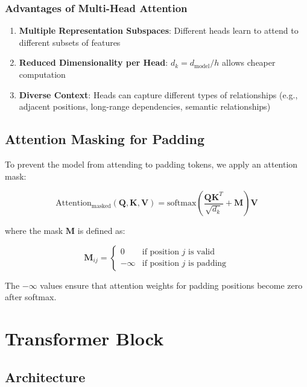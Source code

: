 \documentclass[11pt,a4paper]{article}
\begin{document}
\subsubsection{Advantages of Multi-Head Attention}

\begin{enumerate}
    \item \textbf{Multiple Representation Subspaces}: Different heads learn to attend to different subsets of features
    \item \textbf{Reduced Dimensionality per Head}: $d_k = d_{\text{model}}/h$ allows cheaper computation
    \item \textbf{Diverse Context}: Heads can capture different types of relationships (e.g., adjacent positions, long-range dependencies, semantic relationships)
\end{enumerate}

\subsection{Attention Masking for Padding}

To prevent the model from attending to padding tokens, we apply an attention mask:

\begin{equation}
\text{Attention}_{\text{masked}}(\mathbf{Q}, \mathbf{K}, \mathbf{V}) = \text{softmax}\left(\frac{\mathbf{Q}\mathbf{K}^T}{\sqrt{d_k}} + \mathbf{M}\right)\mathbf{V}
\end{equation}

where the mask $\mathbf{M}$ is defined as:

\begin{equation}
\mathbf{M}_{ij} = \begin{cases}
0 & \text{if position } j \text{ is valid} \\
-\infty & \text{if position } j \text{ is padding}
\end{cases}
\end{equation}

The $-\infty$ values ensure that attention weights for padding positions become zero after softmax.

\section{Transformer Block}

\subsection{Architecture}
\end{document}
